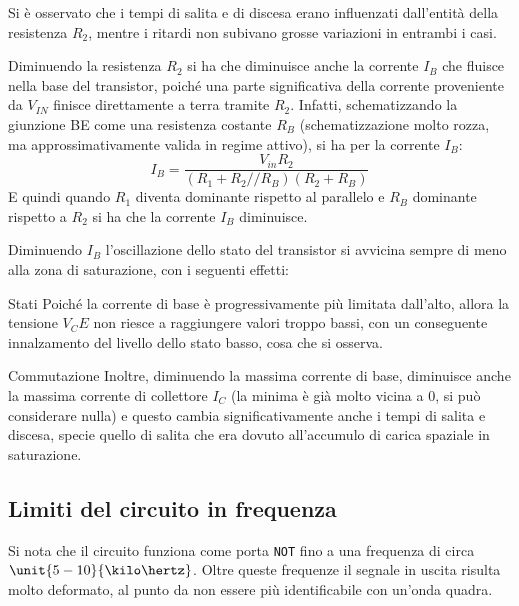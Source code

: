 \documentclass[10pt,a4paper]{article}
\def\code#1{\texttt{#1}}
\begin{document}
Si è osservato che i tempi di salita e di discesa erano influenzati dall'entità della resistenza $R_2$, mentre i ritardi non subivano grosse variazioni in entrambi i casi.

Diminuendo la resistenza $R_2$ si ha che diminuisce anche la corrente $I_B$ che fluisce nella base del transistor, poiché una parte significativa della corrente proveniente da $V_{IN}$ finisce direttamente a terra tramite $R_2$. Infatti, schematizzando la giunzione BE come una resistenza costante $R_B$ (schematizzazione molto rozza, ma approssimativamente valida in regime attivo), si ha per la corrente $I_B$:
\begin{equation*}
I_B = \frac{V_{in} R_2}{(R_1 + R_2 // R_B)(R_2 + R_B)}
\end{equation*}
E quindi quando $R_1$ diventa dominante rispetto al parallelo e $R_B$ dominante rispetto a $R_2$ si ha che la corrente $I_B$ diminuisce.

Diminuendo $I_B$ l'oscillazione dello stato del transistor si avvicina sempre di meno alla zona di saturazione, con i seguenti effetti:
\begin{description}
\item{Stati} Poiché la corrente di base è progressivamente più limitata dall'alto, allora la tensione $V_CE$ non riesce a raggiungere valori troppo bassi, con un conseguente innalzamento del livello dello stato basso, cosa che si osserva.
\item{Commutazione} Inoltre, diminuendo la massima corrente di base, diminuisce anche la massima corrente di collettore $I_C$ (la minima è già molto vicina a 0, si può considerare nulla) e questo cambia significativamente anche i tempi di salita e discesa, specie quello di salita che era dovuto all'accumulo di carica spaziale in saturazione.
\end{description}

\subsection{Limiti del circuito in frequenza}
Si nota che il circuito funziona come porta \code{NOT} fino a una frequenza di circa $\unit{5-10}{\kilo\hertz}$. Oltre queste frequenze il segnale in uscita risulta molto deformato, al punto da non essere più identificabile con un'onda quadra.
\end{document}
